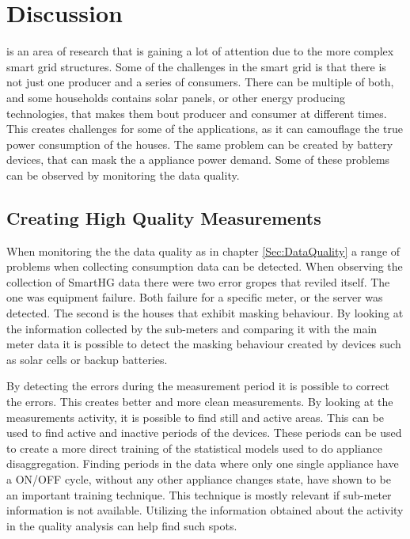 \chapter{Discussion}

 is an area of research that is gaining a lot of attention due to the more complex smart grid structures. Some of the challenges in the smart grid is that there is not just one producer and a series of consumers. There can be multiple of both, and some households contains solar panels, or other energy producing technologies, that makes them bout producer and consumer at different times. This creates challenges for some of the  applications, as it can camouflage the true power consumption of the houses. The same problem can be created by battery devices, that can mask the a appliance power demand. Some of these problems can be observed by monitoring the data quality.

\section{Creating High Quality Measurements}
When monitoring the the data quality as in chapter \ref{Sec:DataQuality} a range of problems when collecting consumption data can be detected. When observing the collection of SmartHG data there were two error gropes that reviled itself. The one was equipment failure. Both failure for a specific meter, or the server was detected. The second is the houses that exhibit masking behaviour. By looking at the information collected by the sub-meters and comparing it with the main meter data it is possible to detect the masking behaviour created by devices such as solar cells or backup batteries. 

By detecting the errors during the measurement period it is possible to correct the errors. This creates better and more clean measurements. By looking at the measurements activity, it is possible to find still and active areas. This can be used to find active and inactive periods of the devices. These periods can be used to create a more direct training of the statistical models used to do appliance disaggregation. Finding periods in the data where only one single appliance have a ON/OFF cycle, without any other appliance changes state, have shown to be an important training technique. This technique is mostly relevant if sub-meter information is not available. Utilizing the information obtained about the activity in the quality analysis can help find such spots.

